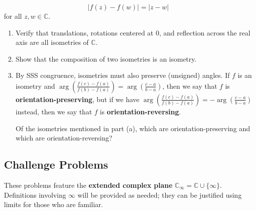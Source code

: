 \begin{enumerate}
\begin{equation*}
\lvert f(z) - f(w)\rvert = \lvert z - w\rvert
\end{equation*}
for all $z,w\in\mathbb{C}$.
\begin{enumerate}
\item Verify that translations, rotations centered at 0, and reflection across the real axis are all isometries of $\mathbb{C}$.
\item Show that the composition of two isometries is an isometry.
\item By SSS congruence, isometries must also preserve (unsigned) angles. If $f$ is an isometry and $\arg(\frac{f(c) - f(a)}{f(b) - f(a)}) = \arg(\frac{c - a}{b - a})$, then we say that $f$ is \textbf{orientation-preserving}, but if we have $\arg(\frac{f(c) - f(a)}{f(b) - f(a)}) = -\arg(\frac{c - a}{b - a})$ instead, then we say that $f$ is \textbf{orientation-reversing}.\par
Of the isometries mentioned in part (a), which are orientation-preserving and which are orientation-reversing?
\end{enumerate}
\end{enumerate}


\subsection{Challenge Problems}

These problems feature the \textbf{extended complex plane} $\mathbb{C}_{\infty} = \mathbb{C}\cup\{\infty\}$. Definitions involving $\infty$ will be provided as needed; they can be justified using limits for those who are familiar.


